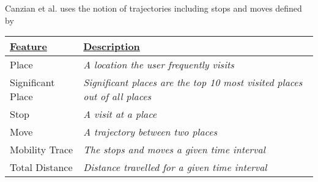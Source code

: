 Canzian et al. \cite{Canzian2015} uses the notion of trajectories including stops and moves defined by \cite{trajectories2008}


\begin{table}[h]
    \centering
\begin{tabular}{|p{}|p{}|}
\hline
{\ul \textbf{Feature}}       & {\ul \textbf{Description}}                                                                                                                                        \\ \hline
Place                        & \textit{A location the user frequently visits}                                                                                                                    \\ \hline
Significant Place            & \textit{Significant places are the top 10 most visited places out of all places}                                                                                  \\ \hline
Stop                         & \textit{A visit at a place}                                                                                                                                       \\ \hline
Move                         & \textit{A trajectory between two places}                                                                                                                          \\ \hline
Mobility Trace               & \textit{The stops and moves a given time interval}                                                                                                                \\ \hline
Total Distance               & \textit{Distance travelled for a given time interval}                                                                                                             \\ \hline

\end{tabular}
\end{table}
